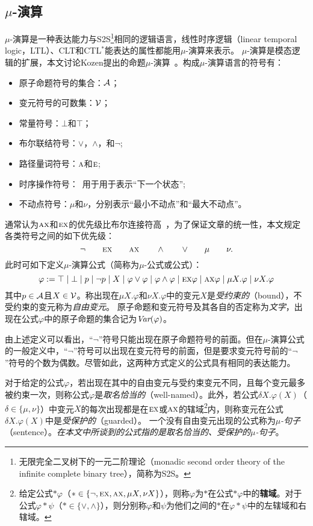 \subsection{$\mu$-演算}
$\mu$-演算是一种表达能力与S2S\footnote{无限完全二叉树下的一元二阶理论（monadic second order theory of the infinite complete binary tree），简称为S2S。}相同的逻辑语言，线性时序逻辑（linear temporal  logic，LTL）、CLT和CTL$^*$能表达的属性都能用$\mu$-演算来表示。
$\mu$-演算是模态逻辑的扩展，本文讨论Kozen提出的命题$\mu$-演算~\cite{DBLP:journals/cacm/Kozen83}。构成$\mu$-演算语言的符号有：
\begin{itemize}
	\item 原子命题符号的集合：$\cal A$；
	\item 变元符号的可数集：$\cal V$；
	\item 常量符号：$\bot$和$\top$；
	\item 布尔联结符号：$\vee$，$\wedge$，和$\neg$;
	\item 路径量词符号：$\textsc{a}$和$\textsc{e}$;
	\item 时序操作符号：\NEXT\ 用于用于表示“下一个状态”;
	\item 不动点符号：$\mu$和$\nu$，分别表示“最小不动点”和“最大不动点”。
\end{itemize}

通常认为$\textsc{a}\textsc{x}$和$\textsc{e}\textsc{x}$的优先级比布尔连接符高~\cite{bradfield2018mu}，为了保证文章的统一性，本文规定各类符号之间的如下优先级：
\[
\neg\qquad \textsc{e}\textsc{x}\qquad \textsc{a}\textsc{x}\qquad \wedge\qquad \vee\qquad \mu\qquad \nu.
\]
此时可如下定义$\mu$-演算公式（简称为$\mu$-公式或公式）：
\[
\varphi := \top \mid \bot \mid p\mid \neg p\mid  X\mid \varphi \vee \varphi \mid \varphi \wedge \varphi \mid \textsc{e}\textsc{x} \varphi\mid \textsc{a}\textsc{x} \varphi \mid \mu X. \varphi\mid \nu X. \varphi
\]
其中$p\in {\cal A}$且$X\in {\cal V}$。称出现在$\mu X. \varphi$和$\nu X. \varphi$中的变元$X$是\emph{受约束的}（bound），不受约束的变元称为\emph{自由变元}。
原子命题和变元符号及其各自的否定称为\emph{文字}，出现在公式$\varphi$中的原子命题的集合记为$\textit{Var}(\varphi)$。

由上述定义可以看出，“$\neg$”符号只能出现在原子命题符号的前面。但在$\mu$-演算公式的一般定义中，“$\neg$”符号可以出现在变元符号的前面，但是要求变元符号前的“$\neg$”符号的个数为偶数。尽管如此，这两种方式定义的公式具有相同的表达能力。

对于给定的公式$\varphi$，若出现在其中的自由变元与受约束变元不同，且每个变元最多被约束一次，则称公式$\varphi$是\emph{取名恰当的}（well-named）。此外，若公式$\delta X.\varphi(X)$（$\delta \in \{\mu, \nu\}$）中变元$X$的每次出现都是在$\textsc{e}\textsc{x}$或$\textsc{a}\textsc{x}$的辖域\footnote{给定公式$*\varphi$（$*\in \{\neg, \textsc{e}\textsc{x},\textsc{a}\textsc{x}, \mu X, \nu X\}$），则称$\varphi$为$*$在公式$*\varphi$中的\textbf{辖域}。对于公式$\varphi * \psi$（$*\in \{\vee, \wedge\}$），则分别称$\varphi$和$\psi$为他们之间的$*$在$\varphi * \psi$中的左辖域和右辖域。}内，则称变元在公式$\delta X.\varphi(X)$中是\emph{受保护的}（guarded）。
一个没有自由变元出现的公式称为\emph{$\mu$-句子}（sentence）。\emph{在本文中所谈到的公式指的是取名恰当的、受保护的$\mu$-句子}。

